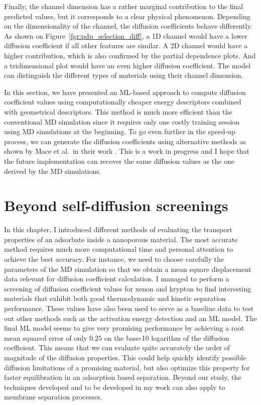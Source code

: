 \documentclass[main]{subfiles}
\begin{document}
Finally, the channel dimension has a rather marginal contribution to the final predicted values, but it corresponds to a clear physical phenomenon. Depending on the dimensionality of the channel, the diffusion coefficients behave differently. As shown on Figure~\ref{fgr:pdp_selection_diff}, a 1D channel would have a lower diffusion coefficient if all other features are similar. A 2D channel would have a higher contribution, which is also confirmed by the partial dependence plots. And a tridimensional plot would have an even higher diffusion coefficient. The model can distinguish the different types of materials using their channel dimension.

In this section, we have presented an ML-based approach to compute diffusion coefficient values using computationally cheaper energy descriptors combined with geometrical descriptors. This method is much more efficient than the conventional MD simulation since it requires only one costly training session using MD simulations at the beginning. To go even further in the speed-up process, we can generate the diffusion coefficients using alternative methods as shown by Mace et al.\ in their work \autocite{Mace_2019}. This is a work in progress and I hope that the future implementation can recover the same diffusion values as the one derived by the MD simulations.

\clearpage
\section{Beyond self-diffusion screenings}

In this chapter, I introduced different methods of evaluating the transport properties of an adsorbate inside a nanoporous material. The most accurate method requires much more computational time and personal attention to achieve the best accuracy. For instance, we need to choose carefully the parameters of the MD simulation so that we obtain a mean square displacement data relevant for diffusion coefficient calculation. I managed to perform a screening of diffusion coefficient values for xenon and krypton to find interesting materials that exhibit both good thermodynamic and kinetic separation performance. These values have also been used to serve as a baseline data to test out other methods such as the activation energy detection and an ML model. The final ML model seems to give very promising performance by achieving a root mean squared error of only $0.25$ on the base-10 logarithm of the diffusion coefficient. This means that we can evaluate quite accurately the order of magnitude of the diffusion properties. This could help quickly identify possible diffusion limitations of a promising material, but also optimize this property for faster equilibration in an adsorption based separation. Beyond our study, the techniques developed and to be developed in my work can also apply to membrane separation processes.
\end{document}
